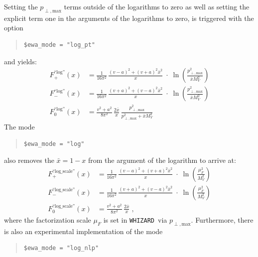 \documentclass[12pt]{book}
\newcommand{\ttt}[1]{\texttt{#1}}
\newcommand{\whizard}{\ttt{WHIZARD}}
\begin{document}
Setting the $p_{\perp,\textrm{max}}$ terms outside of the logarithms
to zero as well as setting the explicit term one in the arguments of
the logarithms to zero, is triggered with the option
\begin{quote}
\begin{footnotesize}
\begin{Verbatim}
$ewa_mode = "log_pt"
\end{Verbatim}
\end{footnotesize}
\end{quote}
and yields:
\begin{align}
  \label{eq:ewa_log}
  F^{\text{``log''}}_{+}(x) &= \frac{1}{16\pi^2}\,\frac{(v-a)^2 + (v+a)^2\bar x^2}{x}
  \; \cdot \; 
  \ln\left(\frac{p_{\perp,\textrm{max}}^2}{\bar x M_V^2}\right)
  \\
  F^{\text{``log''}}_{-}(x) &= \frac{1}{16\pi^2}\,\frac{(v+a)^2 + (v-a)^2\bar x^2}{x}
  \; \cdot \; 
  \ln\left(\frac{p_{\perp,\textrm{max}}^2}{\bar x M_V^2}\right)
  \\
  F^{\text{``log''}}_0(x) &= \frac{v^2+a^2}{8\pi^2}\,\frac{2\bar x}{x}\,
  \frac{p_{\perp,\textrm{max}}^2}{p_{\perp,\textrm{max}}^2 + \bar x M_V^2}
\end{align}
The mode 
\begin{quote}
\begin{footnotesize}
\begin{Verbatim}
$ewa_mode = "log"
\end{Verbatim}
\end{footnotesize}
\end{quote}
also removes the $\bar{x} = 1 -x$ from the argument of the logarithm
to arrive at:
\begin{align}
  \label{eq:log_scale}
  F^{\text{``log\_scale''}}_{+}(x) &= \frac{1}{16\pi^2}\,\frac{(v-a)^2 + (v+a)^2\bar x^2}{x}
  \; \cdot \; 
  \ln\left(\frac{\mu_F^2}{M_V^2}\right)
  \\
  F^{\text{``log\_scale''}}_{-}(x) &= \frac{1}{16\pi^2}\,\frac{(v+a)^2 + (v-a)^2\bar x^2}{x}
  \; \cdot \; 
  \ln\left(\frac{\mu_F^2}{M_V^2}\right)
  \\
  F^{\text{``log\_scale''}}_0(x) &=
  \frac{v^2+a^2}{8\pi^2}\,\frac{2\bar x}{x} \; ,
\end{align}
where the factorization scale $\mu_F$ is set in \whizard\ via $p_{\perp,\textrm{max}}$.
Furthermore, there is also an experimental implementation of the mode
\begin{quote}
\begin{footnotesize}
\begin{Verbatim}
$ewa_mode = "log_nlp"
\end{Verbatim}
\end{footnotesize}
\end{quote}
\end{document}
